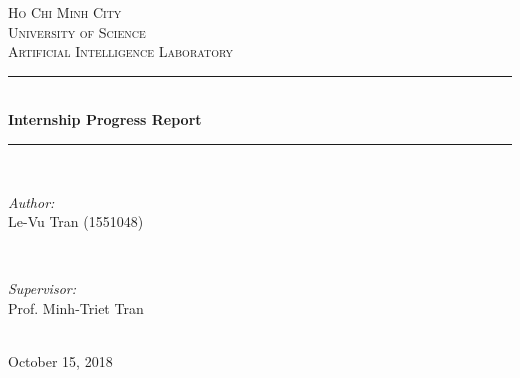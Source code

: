 \begin{titlepage}

\newcommand{\HRule}{\rule{\linewidth}{0.5mm}}

\center

\textsc{\LARGE Ho Chi Minh City\\University of Science}\\[0.5cm]
\textsc{\Large Artificial Intelligence Laboratory}\\[1cm]

\HRule \\[0.6cm]
{\huge \bfseries Internship Progress Report}\\[0.5cm]
\HRule \\[1.5cm]
 

\begin{minipage}{0.4\textwidth}
\begin{flushleft} \large
\emph{Author:}\\
Le-Vu Tran (1551048)
\end{flushleft}
\end{minipage}
~
\begin{minipage}{0.4\textwidth}
\begin{flushright} \large
\emph{Supervisor:} \\
Prof. Minh-Triet Tran
\end{flushright}
\end{minipage}\\[2cm]

{\large October 15, 2018}\\[2cm]

\vfill  
\end{titlepage}
